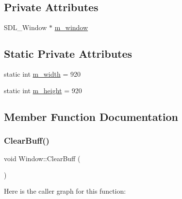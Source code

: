 \subsection*{Private Attributes}
\begin{DoxyCompactItemize}
\item 
S\+D\+L\+\_\+\+Window $\ast$ \mbox{\hyperlink{class_disc___engine_1_1_window_a5aa23b37c2bd5a3af4c3ae5375c59aaf}{m\+\_\+window}}
\end{DoxyCompactItemize}
\subsection*{Static Private Attributes}
\begin{DoxyCompactItemize}
\item 
static int \mbox{\hyperlink{class_disc___engine_1_1_window_a79ee16f303fd806920b529b3488a4ec8}{m\+\_\+width}} = 920
\item 
static int \mbox{\hyperlink{class_disc___engine_1_1_window_a55cc88aeb4f5611aa100b9185f2f90cc}{m\+\_\+height}} = 920
\end{DoxyCompactItemize}


\subsection{Member Function Documentation}
\mbox{\label{class_disc___engine_1_1_window_adc6ab71d35084b660a8b63c4ae2fdbbe}} 
\subsubsection{\texorpdfstring{Clear\+Buff()}{ClearBuff()}}
{\footnotesize\ttfamily void Window\+::\+Clear\+Buff (\begin{DoxyParamCaption}{ }\end{DoxyParamCaption})}

Here is the caller graph for this function\+:
\mbox{\label{class_disc___engine_1_1_window_aa234876b2ba5d3538b717e66c5ccbc5c}} 

